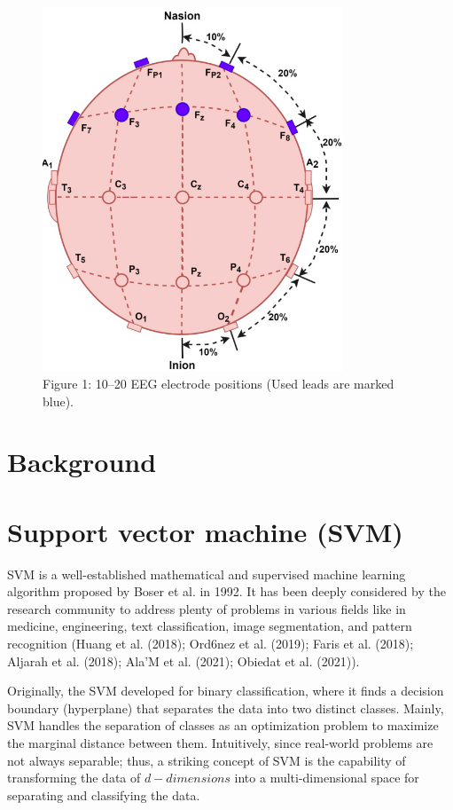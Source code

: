 \documentclass{article}
\begin{document}
\begin{figure}[htbp]
\centering
\includegraphics[width=0.8\textwidth]{images/b92d712fcf89518a10c69122e1cfe2f27d2373e33993274427d2dc4380668c54.jpg}
\caption{Figure 1: 10–20 EEG electrode positions (Used leads are marked blue).}
\end{figure}


\section{Background}


\section{Support vector machine (SVM)}


SVM is a well-established mathematical and supervised machine learning algorithm proposed by Boser et al. in 1992. It has been deeply considered by the research community to address plenty of problems in various fields like in medicine, engineering, text classification, image segmentation, and pattern recognition (Huang et al. (2018); Ord6nez et al. (2019); Faris et al. (2018); Aljarah et al. (2018); Ala’M et al. (2021); Obiedat et al. (2021)).


Originally, the SVM developed for binary classification, where it finds a decision boundary (hyperplane) that separates the data into two distinct classes. Mainly, SVM handles the separation of classes as an optimization problem to maximize the marginal distance between them. Intuitively, since real-world problems are not always separable; thus, a striking concept of SVM is the capability of transforming the data of $d-d i m e n s i o n s$ into a multi-dimensional space for separating and classifying the data.
\end{document}
